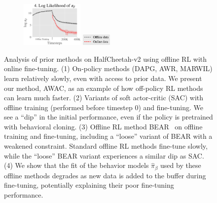 \begin{figure}[t]
\begin{subfigure}[b]{0.22\textwidth}
    \end{subfigure}
    \begin{subfigure}[b]{0.2\textwidth}
        \center
        \includegraphics[height=2.2cm]{awac/figures/challenges/hc_logp_train-crop.pdf}
        \hspace{0.3cm}\includegraphics[height=0.55cm]{awac/figures/challenges/hc_log_probablation_legend-crop.pdf}
    \end{subfigure}
    
    \caption{
    Analysis of prior methods on HalfCheetah-v2 using offline RL with online fine-tuning. (1) On-policy methods (DAPG, AWR, MARWIL) 
    learn relatively slowly, even with access to prior data. We present our method, AWAC, as an example of how off-policy RL methods can learn much faster. (2) Variants of soft actor-critic (SAC) with offline training (performed before timestep 0) and fine-tuning. We see a ``dip'' in the initial performance, even if the policy is pretrained with behavioral cloning.
    (3) Offline RL method BEAR~\citep{kumar19bear} on offline training and fine-tuning, including a ``loose'' variant of BEAR with a weakened constraint. Standard offline RL methods fine-tune slowly, while the ``loose'' BEAR variant experiences a similar dip as SAC. (4) We show that the fit of the behavior models $\hat{\pi}_\beta$ used by these offline methods
    degrades as new data is added to the buffer during fine-tuning, potentially explaining their poor fine-tuning performance.
    \vspace{-0.2in}
    }
    \label{fig:challenges}
\end{figure}
